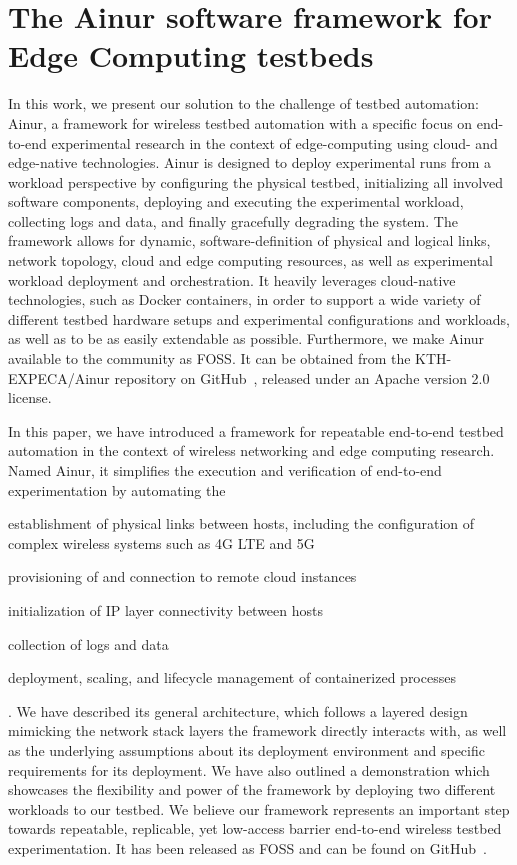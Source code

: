 \section{The Ainur software framework for Edge Computing testbeds}

In this work, we present our solution to the challenge of testbed automation: Ainur, a framework for wireless testbed automation with a specific focus on end-to-end experimental research in the context of edge-computing using cloud- and edge-native technologies.
Ainur is designed to deploy experimental runs from a workload perspective by configuring the physical testbed, initializing all involved software components, deploying and executing the experimental workload, collecting logs and data, and finally gracefully degrading the system.
The framework allows for dynamic, software-definition of physical and logical links, network topology, cloud and edge computing resources, as well as experimental workload deployment and orchestration.
It heavily leverages cloud-native technologies, such as Docker containers, in order to support a wide variety of different testbed hardware setups and experimental configurations and workloads, as well as to be as easily extendable as possible.
Furthermore, we make Ainur available to the community as \ac{FOSS}.
It can be obtained from the {KTH-EXPECA/Ainur} repository on GitHub~\cite{ainur:github}, released under an Apache version \num{2.0} license.

In this paper, we have introduced a framework for repeatable end-to-end testbed automation in the context of wireless networking and edge computing research.
Named Ainur, it simplifies the execution and verification of end-to-end experimentation by automating the
\begin{enumerate*}[itemjoin={{; }}, itemjoin*={{; and }}]
    \item establishment of physical links between hosts, including the configuration of complex wireless systems such as 4G \ac{LTE} and 5G
    \item provisioning of and connection to remote cloud instances
    \item initialization of \ac{IP} layer connectivity between hosts
    \item collection of logs and data
    \item deployment, scaling, and lifecycle management of containerized processes
\end{enumerate*}.
We have described its general architecture, which follows a layered design mimicking the network stack layers the framework directly interacts with, as well as the underlying assumptions about its deployment environment and specific requirements for its deployment.
We have also outlined a demonstration which showcases the flexibility and power of the framework by deploying two different workloads to our testbed.
We believe our framework represents an important step towards repeatable, replicable, yet low-access barrier end-to-end wireless testbed experimentation.
It has been released as \ac{FOSS} and can be found on GitHub~\cite{ainur:github}.\\
